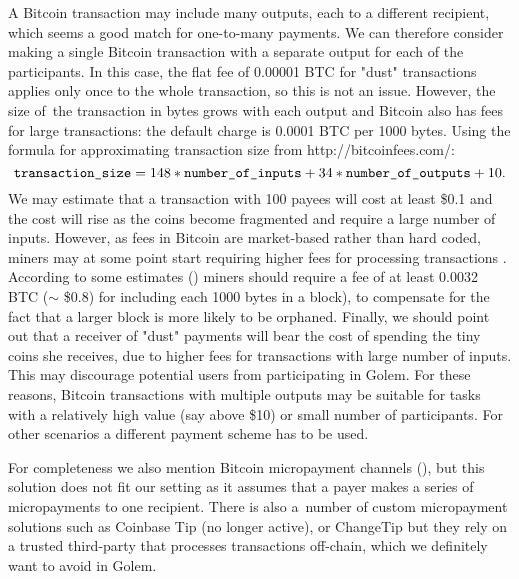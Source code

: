 \documentclass[a4paper]{article}
\newcommand{\BTC}{BTC}
\begin{document}
    A Bitcoin transaction may include many outputs, each to a different recipient, which seems a good match for
    one-to-many payments. We can therefore consider making a single Bitcoin transaction with a separate output
    for each of the participants. In this case, the flat fee of 0.00001 \BTC{} for "dust" transactions applies only
    once to the whole transaction, so this is not an issue. However, the size of~the transaction in bytes grows with
    each output and Bitcoin also has fees for large transactions: the default charge is 0.0001 \BTC{} per 1000 bytes.
    Using the formula for approximating transaction size from http://bitcoinfees.com/\cite{BITFEE}:
    \begin{displaymath}
	    \text{\texttt{transaction\_size}} = 148 * \text{\texttt{number\_of\_inputs}} +
	    34 * \text{\texttt{number\_of\_outputs}} + 10.
	\end{displaymath}
    We may estimate that a transaction with 100 payees will cost at least \$0.1 and the cost will rise as the coins
    become fragmented and require a large number of inputs. However, as fees in Bitcoin are market-based rather than
    hard coded, miners may at some point start requiring higher fees for processing transactions \cite{KASKALOGLU}.
    According to some estimates (\cite{ANDRESEN}) miners should require a fee of
    at least 0.0032 \BTC{} ($\sim$ \$0.8) for including each 1000 bytes in a block), to compensate for the fact that
    a larger block is more likely to be orphaned. Finally, we should point out that a receiver of "dust" payments will
    bear the cost of spending the tiny coins she receives, due to higher fees for transactions with large number of
    inputs. This may discourage potential users from participating in Golem. For these reasons, Bitcoin transactions
    with multiple outputs may be suitable for tasks with a relatively high value (say above \$10) or small number
    of participants. For other scenarios a different payment scheme has to be used.

    For completeness we also mention Bitcoin micropayment channels (\cite{BITCOINJ}), but this solution does not fit
    our setting as it assumes that a payer makes a series of micropayments to one recipient.
    There is also a~number of custom micropayment solutions such as Coinbase Tip \cite{COINTIP}(no longer active),
    or ChangeTip \cite{CHANGETIP} but they rely on a trusted third-party that processes transactions off-chain,
    which we definitely want to avoid in Golem.
\end{document}
